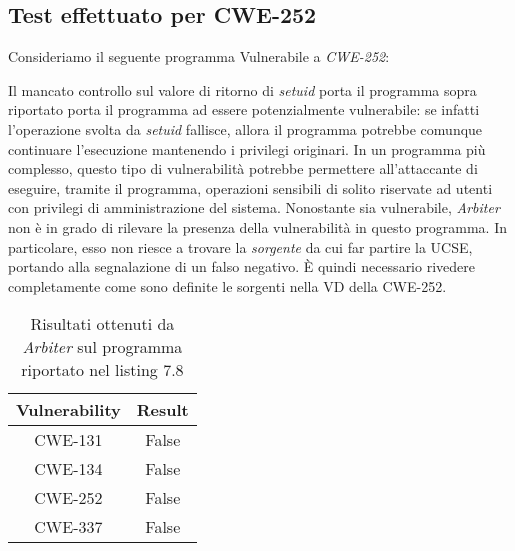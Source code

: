 \documentclass[../main.tex]{subfiles}
\begin{document}
\subsection{Test effettuato per CWE-252}
Consideriamo il seguente programma Vulnerabile a \textit{CWE-252}:

Il mancato controllo sul valore di ritorno di \textit{setuid} porta il programma sopra riportato porta il programma ad essere potenzialmente
vulnerabile: se infatti l'operazione svolta da \textit{setuid} fallisce, allora il programma potrebbe comunque continuare l'esecuzione
mantenendo i privilegi originari. In un programma più complesso, questo tipo di vulnerabilità potrebbe permettere all'attaccante di eseguire, tramite
il programma, operazioni sensibili di solito riservate ad utenti con privilegi di amministrazione del sistema. Nonostante sia vulnerabile, \textit{Arbiter} non è in grado
di rilevare la presenza della vulnerabilità in questo programma. In particolare, esso non riesce a trovare la \textit{sorgente} da cui far partire la UCSE, portando alla segnalazione
di un falso negativo. È quindi necessario rivedere completamente come sono definite le sorgenti nella VD della CWE-252.
\begin{table}[H]
    \centering
    \begin{tabular}{|c|c|}
    \hline
    Vulnerability & Result \\ \hline
    CWE-131       & False   \\ \hline
    CWE-134       & False  \\ \hline
    CWE-252       & False  \\ \hline
    CWE-337       & False  \\ \hline
    \end{tabular}
    \caption{Risultati ottenuti da \textit{Arbiter} sul programma riportato nel listing 7.8}
\end{table}
\end{document}
